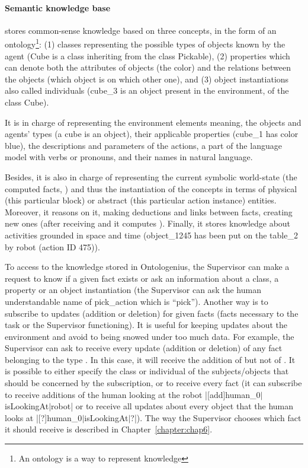 \documentclass[a4paper,11pt,twoside]{StyleThese}
\begin{document}
\paragraph{Semantic knowledge base} stores common-sense knowledge based on three concepts, in the form of an ontology\footnote{An ontology is a way to represent knowledge}: (1) classes representing the possible types of objects known by the agent (\eg Cube is a class inheriting from the class Pickable), (2) properties which can denote both the attributes of objects (\eg the color) and the relations between the objects (\eg which object is on which other one), and (3) object instantiations also called individuals (\eg cube\_3 is an object present in the environment, of the class Cube).

It is in charge of representing the environment elements meaning, the objects and agents' types (\eg a cube is an object), their applicable properties (\eg cube\_1 has color blue), the descriptions and parameters of the actions, a part of the language model with verbs or pronouns, and their names in natural language.
	
Besides, it is also in charge of representing the current symbolic world-state (the computed facts, \eg {}) and thus the instantiation of the concepts in terms of physical (\eg this particular block) or abstract (\eg this particular action instance) entities. Moreover, it reasons on it, making deductions and links between facts, creating new ones (\eg after receiving  and it computes ). Finally, it stores knowledge about activities grounded in space and time (\eg object\_1245 has been put on the table\_2 by robot (action ID 475)).

To access to the knowledge stored in Ontologenius, the Supervisor can make a request to know if a given fact exists or ask an information about a class, a property or an object instantiation (\eg the Supervisor can ask the human understandable name of pick\_action which is ``pick''). Another way is to subscribe to updates (addition or deletion) for given facts (\ie facts necessary to the task or the Supervisor functioning). It is useful for keeping updates about the environment and avoid to being snowed under too much data. For example, the Supervisor can ask to receive every update (addition or deletion) of any fact belonging to the type . In this case, it will receive the addition of  but not of . It is possible to either specify the class or individual of the subjects/objects that should be concerned by the subscription, or to receive every fact (\eg it can subscribe to receive additions of the human looking at the robot |[add]human_0$\lvert$isLookingAt$\lvert$robot| or to receive all updates about every object that the human looks at |[?]human_0$\lvert$isLookingAt$\lvert$?|). The way the Supervisor chooses which fact it should receive is described in Chapter~\ref{chapter:chap6}.
\end{document}
